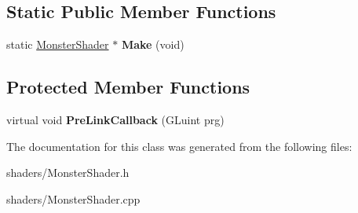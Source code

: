 \subsection*{\-Static \-Public \-Member \-Functions}
\begin{DoxyCompactItemize}
\item 
\hypertarget{classMonsterShader_abc5a799789863cfda3f646f4b5539422}{static \hyperlink{classMonsterShader}{\-Monster\-Shader} $\ast$ {\bfseries \-Make} (void)}\label{classMonsterShader_abc5a799789863cfda3f646f4b5539422}

\end{DoxyCompactItemize}
\subsection*{\-Protected \-Member \-Functions}
\begin{DoxyCompactItemize}
\item 
\hypertarget{classMonsterShader_a1ff281ab87f60b5f605c51368352c88f}{virtual void {\bfseries \-Pre\-Link\-Callback} (\-G\-Luint prg)}\label{classMonsterShader_a1ff281ab87f60b5f605c51368352c88f}

\end{DoxyCompactItemize}


\-The documentation for this class was generated from the following files\-:\begin{DoxyCompactItemize}
\item 
shaders/\-Monster\-Shader.\-h\item 
shaders/\-Monster\-Shader.\-cpp\end{DoxyCompactItemize}
